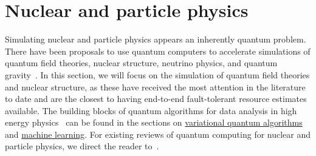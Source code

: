 

\section{Nuclear and particle physics  }\label{appl:NuclearParticle}

\begin{refsection}
    
Simulating nuclear and particle physics appears an inherently quantum problem. There have been proposals to use quantum computers to accelerate simulations of quantum field theories, nuclear structure, neutrino physics, and quantum gravity~\cite{davoudi2022quantumHEP}. In this section, we will focus on the simulation of quantum field theories and nuclear structure, as these have received the most attention in the literature to date and are the closest to having end-to-end fault-tolerant resource estimates available. The building blocks of quantum algorithms for data analysis in high energy physics~\cite{delgado2022HEPdataanalysis} can be found in the sections on \hyperref[prim:VQA]{variational quantum algorithms} and \hyperref[appl:ClassicalML]{machine learning}. For existing reviews of quantum computing for nuclear and particle physics, we direct the reader to~\cite{preskill2018SimQFT,Banuls2020SimulatingLatticeGaugeTheoryReviewEurophys,davoudi2022quantumHEP,funcke2023LatticeReview}.





\localtableofcontents

\printbibliography[heading=secbib,segment=\therefsegment]

\end{refsection}


\newpage


